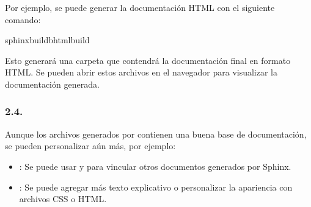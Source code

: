 \documentclass[a4paper,10pt,spanish]{sphinxmanual}
\begin{document}
\sphinxAtStartPar
Por ejemplo, se puede generar la documentación HTML con el siguiente comando:

\begin{sphinxVerbatim}[commandchars=\\\{\}]
sphinx\PYGZhy{}build\PYGZhy{}bhtmlbuild
\end{sphinxVerbatim}

\sphinxAtStartPar
Esto generará una carpeta  que contendrá la documentación final en formato HTML. Se pueden abrir estos archivos en el navegador para visualizar la documentación generada.


\subsubsection{2.4. }
\label{\detokenize{configuracion_inicial/007.Creacion_de_ficheros_de_codigo_y_generacion_automatica_de_documentacion:personalizacion-de-la-documentacion-generada}}
\sphinxAtStartPar
Aunque los archivos generados por  contienen una buena base de documentación, se pueden personalizar aún más, por ejemplo:
\begin{itemize}
\item {} 
\sphinxAtStartPar
{}: Se puede usar  y  para vincular otros documentos generados por Sphinx.

\item {} 
\sphinxAtStartPar
{}: Se puede agregar más texto explicativo o personalizar la apariencia con archivos CSS o HTML.

\end{itemize}
\end{document}

